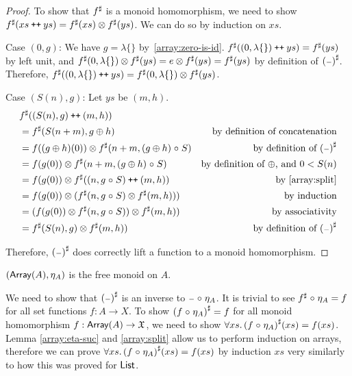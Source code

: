 \begin{proof}
    To show that ${f}^{\sharp}$ is a monoid homomorphism,
    we need to show ${f}^{\sharp}(xs \mathbin{\text{\ttfamily\upshape ++}} ys) = {f}^{\sharp}(xs) \otimes {f}^{\sharp}(ys)$.
    We can do so by induction on $xs$.

    Case $(0, g)$:
    We have $g = \lambda\{\}$ by~\ref{array:zero-is-id}.
    ${f}^{\sharp}((0, \lambda\{\}) \mathbin{\text{\ttfamily\upshape ++}} ys) = {f}^{\sharp}(ys)$ by left unit,
    and ${f}^{\sharp}(0, \lambda\{\}) \otimes {f}^{\sharp}(ys) = e \otimes {f}^{\sharp}(ys) = {f}^{\sharp}(ys)$
    by definition of ${({\scriptstyle{-}})}^{\sharp}$. Therefore,
    ${f}^{\sharp}((0, \lambda\{\}) \mathbin{\text{\ttfamily\upshape ++}} ys) = {f}^{\sharp}(0, \lambda\{\}) \otimes {f}^{\sharp}(ys)$.

    Case $(S(n), g)$: Let $ys$ be $(m, h)$.
    \begin{align*}
       & {f}^{\sharp}((S(n), g) \mathbin{\text{\ttfamily\upshape ++}} (m, h)) \\
       & = {f}^{\sharp}(S(n + m), g \oplus h) & \text{by definition of concatenation} \\
       & = f((g \oplus h)(0)) \otimes {f}^{\sharp}(n + m, (g \oplus h) \mathrel{\circ} S) & \text{by definition of ${({\scriptstyle{-}})}^{\sharp}$} \\
       & = f(g(0)) \otimes {f}^{\sharp}(n + m, (g \oplus h) \mathrel{\circ} S) & \text{by definition of $\oplus$, and $0 < S(n)$} \\
       & = f(g(0)) \otimes {f}^{\sharp}((n, g \mathrel{\circ} S) \mathbin{\text{\ttfamily\upshape ++}} (m, h)) & \text{by~\ref{array:split}} \\
       & = f(g(0)) \otimes ({f}^{\sharp}(n, g \mathrel{\circ} S) \otimes {f}^{\sharp}(m, h))) & \text{by induction} \\
       & = (f(g(0)) \otimes {f}^{\sharp}(n, g \mathrel{\circ} S)) \otimes {f}^{\sharp}(m, h)) & \text{by associativity} \\
       & = {f}^{\sharp}(S(n), g) \otimes {f}^{\sharp}(m, h)) & \text{by definition of ${({\scriptstyle{-}})}^{\sharp}$} \\
    \end{align*}

    Therefore, ${({\scriptstyle{-}})}^{\sharp}$ does correctly lift a function to a monoid homomorphism.
\end{proof}

\begin{propositionrep}\label{array:univ}
    $(\operatorname{\mathsf{Array}}(A),\eta_A)$ is the free monoid on $A$.
\end{propositionrep}

\begin{proofsketch}
    We need to show that ${({\scriptstyle{-}})}^{\sharp}$ is an inverse to ${\scriptstyle{-}} \mathrel{\circ} \eta_A$.
    It is trivial to see ${f}^{\sharp} \mathrel{\circ} \eta_A = f$ for all set functions $f : A \to X$.
    To show ${(f \mathrel{\circ} \eta_A)}^{\sharp} = f$ for all monoid homomorphism $f : \operatorname{\mathsf{Array}}(A) \to \mathfrak{X}$,
    we need to show $\forall xs.\, {(f \mathrel{\circ} \eta_A)}^{\sharp}(xs) = f(xs)$.
    Lemma \ref{array:eta-suc} and \ref{array:split} allow us to perform induction on arrays,
    therefore we can prove $\forall xs.\, {(f \mathrel{\circ} \eta_A)}^{\sharp}(xs) = f(xs)$ by induction $xs$
    very similarly to how this was proved for $\operatorname{\mathsf{List}}$.
\end{proofsketch}

